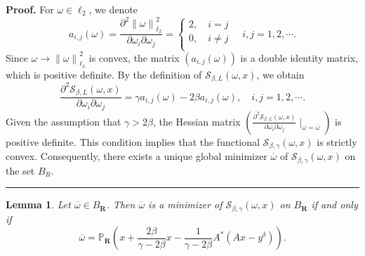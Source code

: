 \documentclass[a4paper,12pt]{article}
\newtheorem{lemma}[theorem]{Lemma}
\numberwithin{equation}{section}
\newenvironment{proof}[1][Proof]{\textbf{#1.} }
{\ \rule{0.75em}{0.75em}\smallskip}
\begin{document}
\begin{proof}
    For $\omega\in\ell_{2}$, we denote
    \begin{equation*}
        a_{i,j}\left(\omega\right)=\frac{\partial^{2} \left\|\omega\right\|_{\ell_{2}}^{2}} {\partial \omega_{i}\partial \omega_{j}}=
        \left\{             
            \begin{array}{ll}
            2, \quad i=j \\
            0, \quad i\neq j\\
            \end{array}
        \right.
        \quad i,j=1,2,\cdots.
    \end{equation*}
    Since $\omega\rightarrow \left\|\omega\right\|_{\ell_{2}}^{2}$ is convex, the matrix $\left(a_{i,j}\left(\omega\right)\right)$ is a double identity matrix, which is positive definite. By the definition of $\mathcal{S}_{\beta,L}(\omega,x)$, we obtain
    \begin{equation*}
        \frac{\partial^{2} \mathcal{S}_{\beta,L}(\omega,x)} {\partial \omega_{i}\partial \omega_{j}}= \gamma a_{i,j}\left(\omega\right)-2\beta a_{i,j}\left(\omega\right), \quad i,j=1,2,\cdots.
    \end{equation*}
    Given the assumption that $\gamma> 2\beta$, the Hessian matrix $\left(\frac{\partial^{2} \mathcal{S}_{\beta,L}(\omega,x)} {\partial \omega_{i}\partial \omega_{j}}\mid_{\omega=\overline{\omega}}\right)$ is positive definite. This condition implies that the functional  $\mathcal{S}_{\beta,\gamma}(\omega,x)$ is strictly convex. 
    Consequently, there exists a unique global minimizer $\overline{\omega}$ of $\mathcal{S}_{\beta,\gamma}(\omega,x)$ on the set $B_{R}$.
\end{proof}

\begin{lemma}\label{lem5.5}
    Let $\overline{\omega}\in B_{\mathbf{R}}$. Then $\overline{\omega}$ is a minimizer of $\mathcal{S}_{\beta,\gamma}\left(\omega,x\right)$ on $B_{\mathbf{R}}$ if and only if
    \begin{equation}\label{equ5.6}
        \overline{\omega}=\mathbb{P}_{\mathbf{R}}\left(x+\frac{2\beta}{\gamma-2\beta}x -\frac{1}{\gamma-2\beta}A^{*}\left(Ax-y^{\delta}\right)\right).
    \end{equation}
\end{lemma}
\end{document}
